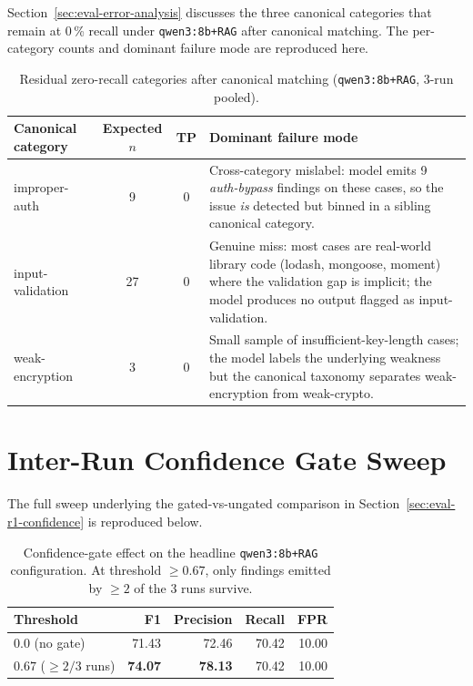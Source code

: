 Section~\ref{sec:eval-error-analysis} discusses the three canonical categories that remain at 0\,\% recall under \texttt{qwen3:8b+RAG} after canonical matching. The per-category counts and dominant failure mode are reproduced here.

\begin{table}[H]
\centering
\caption{Residual zero-recall categories after canonical matching (\texttt{qwen3:8b+RAG}, 3-run pooled).}
\label{tab:failure-modes-app}
\footnotesize
\begin{tabular}{@{}lccp{6.5cm}@{}}
\toprule
\textbf{Canonical category} & \textbf{Expected $n$} & \textbf{TP} & \textbf{Dominant failure mode} \\
\midrule
improper-auth      & 9  & 0 & Cross-category mislabel: model emits 9 \emph{auth-bypass} findings on these cases, so the issue \emph{is} detected but binned in a sibling canonical category. \\
input-validation   & 27 & 0 & Genuine miss: most cases are real-world library code (lodash, mongoose, moment) where the validation gap is implicit; the model produces no output flagged as input-validation. \\
weak-encryption    & 3  & 0 & Small sample of insufficient-key-length cases; the model labels the underlying weakness but the canonical taxonomy separates weak-encryption from weak-crypto. \\
\bottomrule
\end{tabular}
\end{table}

\section{Inter-Run Confidence Gate Sweep}
\label{app:r1-confidence-sweep}

The full sweep underlying the gated-vs-ungated comparison in Section~\ref{sec:eval-r1-confidence} is reproduced below.

\begin{table}[H]
\centering
\caption[Confidence-gate effect on the headline configuration.]{Confidence-gate effect on the headline \texttt{qwen3:8b+RAG} configuration. At threshold $\geq 0.67$, only findings emitted by $\geq 2$ of the 3 runs survive.}
\label{tab:r1-confidence-sweep-app}
\footnotesize
\begin{tabular}{@{}lrrrr@{}}
\toprule
\textbf{Threshold} & \textbf{F1} & \textbf{Precision} & \textbf{Recall} & \textbf{FPR} \\
\midrule
$0.0$  (no gate)         & 71.43 & 72.46 & 70.42 & 10.00 \\
$0.67$ ($\geq 2/3$ runs) & \textbf{74.07} & \textbf{78.13} & 70.42 & 10.00 \\
\bottomrule
\end{tabular}
\end{table}

